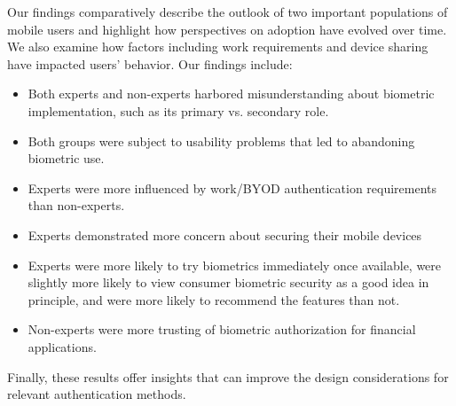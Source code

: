 

Our findings comparatively describe the outlook of two important populations of
mobile users and highlight how perspectives on adoption have evolved over
time. We also examine how factors including work requirements and device sharing
have impacted users' behavior. Our findings include:
\begin{itemize}
\item Both experts and non-experts harbored misunderstanding about biometric implementation, such as its primary vs. secondary role.
\item Both groups were subject to usability problems that led to abandoning biometric use.
\item Experts were more influenced by work/BYOD authentication requirements than non-experts.
\item Experts demonstrated more concern about securing their mobile devices
\item Experts were more likely to try biometrics immediately once available, were slightly more likely to view consumer biometric security as a good idea in principle, and were more likely to recommend the features than not. 
\item Non-experts were more trusting of biometric authorization for financial applications.
\end{itemize}
Finally, these results offer insights that can
improve the design considerations for relevant authentication methods.


